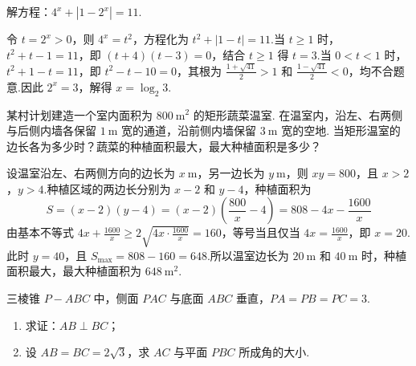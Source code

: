 \begin{problem}
解方程：\(4^{x} + |1 - 2^{x}| = 11\).
\end{problem}

\begin{solution}
令 \(t=2^x>0\)，则 \(4^x=t^2\)，方程化为 \(t^2+\lvert1-t\rvert=11\).当 \(t\geqslant1\) 时，\(t^2+t-1=11\)，即 \((t+4)(t-3)=0\)，结合 \(t\geqslant1\) 得 \(t=3\).当 \(0<t<1\) 时，\(t^2+1-t=11\)，即 \(t^2-t-10=0\)，其根为 \(\frac{1+\sqrt{41}}2>1\) 和 \(\frac{1-\sqrt{41}}2<0\)，均不合题意.因此 \(2^x=3\)，解得 \(x=\log_2 3\).
\end{solution}

\begin{problem}
某村计划建造一个室内面积为 \(800\mathrm{~m}^{2}\) 的矩形蔬菜温室. 在温室内，沿左、右两侧与后侧内墙各保留 \(1\mathrm{~m}\) 宽的通道，沿前侧内墙保留 \(3\mathrm{~m}\) 宽的空地. 当矩形温室的边长各为多少时？蔬菜的种植面积最大，最大种植面积是多少？
\end{problem}

\begin{solution}
设温室沿左、右两侧方向的边长为 \(x\mathrm{~m}\)，另一边长为 \(y\mathrm{~m}\)，则 \(xy=800\)，且 \(x>2\)，\(y>4\).种植区域的两边长分别为 \(x-2\) 和 \(y-4\)，种植面积为
\[
S=(x-2)(y-4)=(x-2)\left(\frac{800}{x}-4\right)=808-4x-\frac{1600}{x}
\]
由基本不等式 \(4x+\frac{1600}{x}\geqslant2\sqrt{4x\cdot\frac{1600}{x}}=160\)，等号当且仅当 \(4x=\frac{1600}{x}\)，即 \(x=20\).此时 \(y=40\)，且 \(S_{\max}=808-160=648\).所以温室边长为 \(20\mathrm{~m}\) 和 \(40\mathrm{~m}\) 时，种植面积最大，最大种植面积为 \(648\mathrm{~m}^{2}\).
\end{solution}

\begin{problem}
三棱锥 \(P - ABC\) 中，侧面 \(PAC\) 与底面 \(ABC\) 垂直，\(PA = PB = PC = 3\).

\begin{enumerate}
\item 求证：\(AB \perp BC\)；
\item 设 \(AB = BC = 2\sqrt{3}\)，求 \(AC\) 与平面 \(PBC\) 所成角的大小.
\end{enumerate}

\end{problem}

